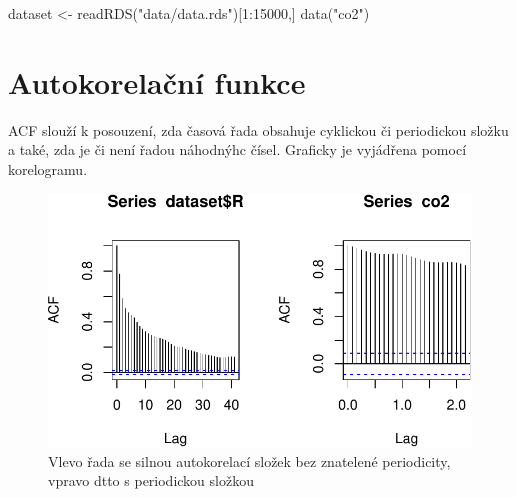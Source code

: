 \documentclass[
  letterpaper,
  DIV=11,
  numbers=noendperiod]{scrreprt}
\newenvironment{Shaded}{\begin{snugshade}}{\end{snugshade}}
\newcommand{\AttributeTok}[1]{\textcolor[rgb]{0.40,0.45,0.13}{#1}}
\newcommand{\DecValTok}[1]{\textcolor[rgb]{0.68,0.00,0.00}{#1}}
\newcommand{\FunctionTok}[1]{\textcolor[rgb]{0.28,0.35,0.67}{#1}}
\newcommand{\NormalTok}[1]{\textcolor[rgb]{0.00,0.23,0.31}{#1}}
\newcommand{\OtherTok}[1]{\textcolor[rgb]{0.00,0.23,0.31}{#1}}
\newcommand{\SpecialCharTok}[1]{\textcolor[rgb]{0.37,0.37,0.37}{#1}}
\newcommand{\StringTok}[1]{\textcolor[rgb]{0.13,0.47,0.30}{#1}}
\begin{document}
\begin{Shaded}
\begin{Highlighting}[]
\NormalTok{dataset }\OtherTok{\textless{}{-}} \FunctionTok{readRDS}\NormalTok{(}\StringTok{"data/data.rds"}\NormalTok{)[}\DecValTok{1}\SpecialCharTok{:}\DecValTok{15000}\NormalTok{,]}
\FunctionTok{data}\NormalTok{(}\StringTok{"co2"}\NormalTok{)}
\end{Highlighting}
\end{Shaded}

\hypertarget{autokorelaux10dnuxed-funkce}{%
\section{Autokorelační funkce}\label{autokorelaux10dnuxed-funkce}}

ACF slouží k posouzení, zda časová řada obsahuje cyklickou či
periodickou složku a také, zda je či není řadou náhodnýhc čísel.
Graficky je vyjádřena pomocí korelogramu.

\begin{Shaded}
\end{Shaded}

\begin{figure}[H]

{\centering \includegraphics{09_casove_rady_files/figure-pdf/unnamed-chunk-2-1.pdf}

}

\caption{Vlevo řada se silnou autokorelací složek bez znatelené
periodicity, vpravo dtto s periodickou složkou}

\end{figure}
\end{document}
